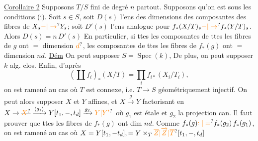 \uline{Corollaire 2} Supposons $T/S$ fini de degré $n$ partout.
Supposons qu'on est sous les conditions (i).
Soit  $s\in S$, soit $D(s)$ l'ens des
dimensions des  composantes des
fibres de $X_s\unsure{\mathbin{-}|\to}Y_s$;  soit $D'(s)$ l'ens
analogue pour $f_\ast(X/T)_s\unsure{\mathbin{-}|\to}f_\ast(Y/T)_s$.
Alors $D(s)=n\,D'(s)$ En particulier,
si ttes les composantes de ttes les
fibres de $g$ ont $=$ dimension $\unsure{d}$,  
les composantes de ttes les fibres
de $f_\ast(g)$ ont $=$ dimension $nd$.
\uline{Dém} On peut supposer $S=\operatorname{Spec}(k)$, De plus,
on peut supposer $k$ alg. clos. Enfin, d'après
\[
(\coprod f_i)_\ast(X/T)=\prod_i f_{i\ast}(X_i/T_i),
\]
on est ramené au cas où $T$ est connexe, i.e.
$T\to S$ géométriquement injectif. On peut
alors supposer $X$ et $Y$ affines, et $X\xrightarrow{g}Y$
 factorisant en $X\to\deleted{\unsure{X}}\xrightarrow{\inserted{g_1}}Y[t_1,\mathbin{-},t_d]\xrightarrow{g_2}\unsure{Y|Y'}$
 où $g_1$ est étale et $g_2$ la
projection can.  Il faut prouver que
ttes les fibres de $f_\ast(g)$ ont dim $nd$.
Comme $f_\ast(g)\unsure{:|=}f_\ast(g_2)\,f_\ast(g_1)$,  on est ramené
au cas où $X=Y[t_1,\mathbin{-}t_d],=Y\times_T\unsure{\overline Z|\overrightarrow Z|\overline T}[t_1,\mathbin{-},t_d]$
\deleted{\unsure{où|i.e.} $Z=T[t$}

